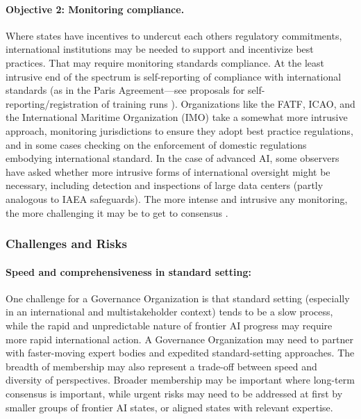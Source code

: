 \documentclass[12pt]{article}
\begin{document}
\paragraph{Objective 2: Monitoring compliance.} Where states have
incentives to undercut each other\textquotesingle s regulatory
commitments, international institutions may be needed to support and
incentivize best practices. That may require monitoring standards
compliance. At the least intrusive end of the spectrum is self-reporting
of compliance with international standards (as in the Paris
Agreement---see proposals for self-reporting/registration of training
runs \cite{anderljung_frontier_2023}). Organizations like the FATF,
ICAO, and the International Maritime Organization (IMO) take a somewhat
more intrusive approach, monitoring jurisdictions to ensure they adopt
best practice regulations, and in some cases checking on the enforcement
of domestic regulations embodying international standard. In the case of
advanced AI, some observers have asked whether more intrusive forms of
international oversight might be necessary, including detection and
inspections of large data centers (partly analogous to IAEA safeguards).
The more intense and intrusive any monitoring, the more challenging it
may be to get to consensus \cite{shavit_what_2023, toivanen_significance_2017}.


\subsubsection*{Challenges and Risks}

\paragraph{Speed and comprehensiveness in standard setting:} One challenge
for a Governance Organization is that standard setting (especially in an
international and multistakeholder context) tends to be a slow process,
while the rapid and unpredictable nature of frontier AI progress may
require more rapid international action. A Governance Organization may
need to partner with faster-moving expert bodies and expedited
standard-setting approaches. The breadth of membership may also
represent a trade-off between speed and diversity of perspectives.
Broader membership may be important where long-term consensus is
important, while urgent risks may need to be addressed at first by
smaller groups of frontier AI states, or aligned states with relevant
expertise.
\end{document}
